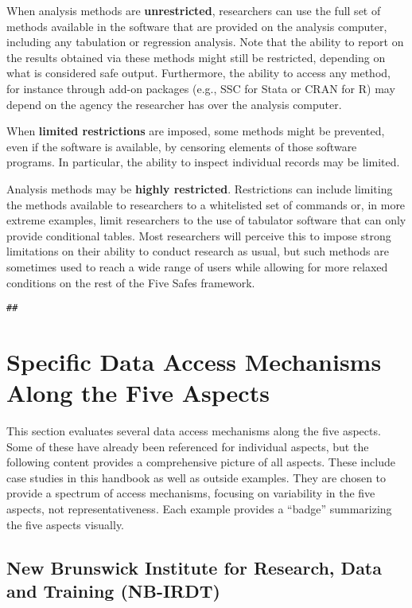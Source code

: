 When analysis methods are \textbf{unrestricted}, researchers can use the full set of methods available in the software that are provided on the analysis computer, including any tabulation or regression analysis. Note that the ability to report on the results obtained via these methods might still be restricted, depending on what is considered safe output. Furthermore, the ability to access any method, for instance through add-on packages (e.g., SSC for Stata or CRAN for R) may depend on the agency the researcher has over the analysis computer.

When \textbf{limited restrictions} are imposed, some methods might be prevented, even if the software is available, by censoring elements of those software programs. In particular, the ability to inspect individual records may be limited.

Analysis methods may be \textbf{highly restricted}. Restrictions can include limiting the methods available to researchers to a whitelisted set of commands or, in more extreme examples, limit researchers to the use of tabulator software that can only provide conditional tables. Most researchers will perceive this to impose strong limitations on their ability to conduct research as usual, but such methods are sometimes used to reach a wide range of users while allowing for more relaxed conditions on the rest of the Five Safes framework.

\begin{verbatim}
## 
\end{verbatim}

\hypertarget{specific-data-access-mechanisms-along-the-five-aspects}{%
\section{Specific Data Access Mechanisms Along the Five Aspects}\label{specific-data-access-mechanisms-along-the-five-aspects}}

This section evaluates several data access mechanisms along the five aspects. Some of these have already been referenced for individual aspects, but the following content provides a comprehensive picture of all aspects. These include case studies in this handbook as well as outside examples. They are chosen to provide a spectrum of access mechanisms, focusing on variability in the five aspects, not representativeness. Each example provides a ``badge'' summarizing the five aspects visually.

\hypertarget{new-brunswick-institute-for-research-data-and-training-nb-irdt}{%
\subsection{New Brunswick Institute for Research, Data and Training (NB-IRDT)}\label{new-brunswick-institute-for-research-data-and-training-nb-irdt}}

